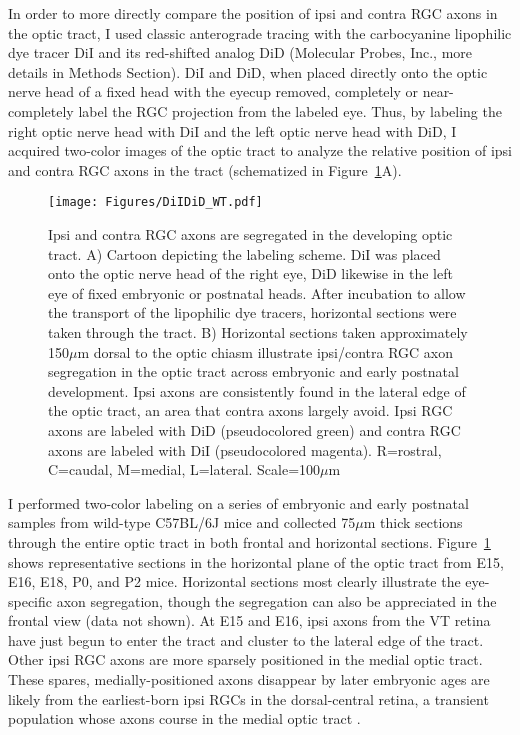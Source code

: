 In order to more directly compare the position of ipsi and contra RGC axons in the optic tract, I used classic anterograde tracing with the carbocyanine lipophilic dye tracer DiI and its red-shifted analog DiD (Molecular Probes, Inc., more details in Methods Section).
DiI and DiD, when placed directly onto the optic nerve head of a fixed head with the eyecup removed, completely or near-completely label the RGC projection from the labeled eye.
Thus, by labeling the right optic nerve head with DiI and the left optic nerve head with DiD, I acquired two-color images of the optic tract to analyze the relative position of ipsi and contra RGC axons in the tract (schematized in Figure~\ref{Figures/DiIDiD_WT}A).

\begin{figure}[hbtp]
    \begin{center}
        \texttt{[image: Figures/DiIDiD\_WT.pdf]}
        \caption[Ipsi and contra RGC axons are segregated in the developing optic tract.]
        {Ipsi and contra RGC axons are segregated in the developing optic tract.
        A) Cartoon depicting the labeling scheme.
        DiI was placed onto the optic nerve head of the right eye, DiD likewise in the left eye of fixed embryonic or postnatal heads.
        After incubation to allow the transport of the lipophilic dye tracers, horizontal sections were taken through the tract.
        B) Horizontal sections taken approximately 150$\mu$m dorsal to the optic chiasm illustrate ipsi/contra RGC axon segregation in the optic tract across embryonic and early postnatal development.
        Ipsi axons are consistently found in the lateral edge of the optic tract, an area that contra axons largely avoid.
        Ipsi RGC axons are labeled with DiD (pseudocolored green) and contra RGC axons are labeled with DiI (pseudocolored magenta).
        R=rostral, C=caudal, M=medial, L=lateral. Scale=100$\mu$m}
        \label{Figures/DiIDiD_WT}
    \end{center}
\end{figure}

I performed two-color labeling on a series of embryonic and early postnatal samples from wild-type C57BL/6J mice and collected 75$\mu$m thick sections through the entire optic tract in both frontal and horizontal sections.
Figure~\ref{Figures/DiIDiD_WT} shows representative sections in the horizontal plane of the optic tract from E15, E16, E18, P0, and P2 mice.
Horizontal sections most clearly illustrate the eye-specific axon segregation, though the segregation can also be appreciated in the frontal view (data not shown). %
At E15 and E16, ipsi axons from the VT retina have just begun to enter the tract and cluster to the lateral edge of the tract.
Other ipsi RGC axons are more sparsely positioned in the medial optic tract.
These spares, medially-positioned axons disappear by later embryonic ages are likely from the earliest-born ipsi RGCs in the dorsal-central retina, a transient population \cite{drager1985birth} whose axons course in the medial optic tract \cite{soares2015transient}.


